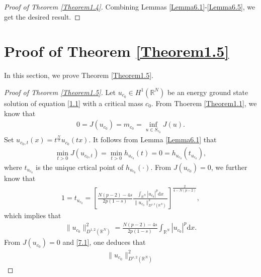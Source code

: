 \documentclass[12pt,a4paper,reqno]{amsart}
\numberwithin{equation}{section}
\begin{document}
\begin{proof}[Proof of Theorem \ref{Theorem1.4}]
Combining Lemmas \ref{Lemma6.1}-\ref{Lemma6.5}, we get the desired result.
\end{proof}



\section{Proof of Theorem \ref{Theorem1.5}}
In this section, we prove Theorem \ref{Theorem1.5}.
\begin{proof}[Proof of Theorem \ref{Theorem1.5}]
Let $u_{c_{0}}\in H^{1}(\mathbb{R}^{N})$ be an energy ground state solution of equation \eqref{1.1} with a critical mass $c_{0}$.
From Thoerem \ref{Theorem1.1}, we know that
\begin{equation*}
\begin{aligned}
0=J(u_{c_{0}})=m_{c_{0}}=\inf_{u\in S_{c_{0}}} J(u).
\end{aligned}
\end{equation*}
Set $u_{c_{0},t}(x)=t^{\frac{N}{2}}u_{c_{0}}(tx)$.
It follows from Lemma \ref{Lemma6.1} that
\begin{equation*}
\begin{aligned}
\min\limits_{t>0}
J(u_{c_{0},t})
=\min\limits_{t>0}
h_{u_{c_{0}}}(t)=0
=h_{u_{c_{0}}}(t_{u_{c_{0}}}),
\end{aligned}
\end{equation*}
where $t_{u_{c_{0}}}$ is the unique crtical point of $h_{u_{c_{0}}}(\cdot)$. From $J(u_{c_{0}})=0$, we further know that
\begin{equation*}
\begin{aligned}
1=t_{u_{c_{0}}}=\left[\frac{N(p-2)-4s}{2p(1-s)}
\frac{\int_{\mathbb{R}^{N}}
|u_{c_{0}}|^{p}
\mathrm{d}x}{\|u_{c_{0}}\|_{D^{1,2}(\mathbb{R}^{N})}^{2}}\right]^{\frac{2}{4-N(p-2)}},
\end{aligned}
\end{equation*}
which implies that
\begin{equation}\label{7.1}
\begin{aligned}
\|u_{c_{0}}\|_{D^{1,2}(\mathbb{R}^{N})}^{2}
=\frac{N(p-2)-4s}{2p(1-s)}
\int_{\mathbb{R}^{N}}
|u_{c_{0}}|^{p}
\mathrm{d}x.
\end{aligned}
\end{equation}
From $J(u_{c_{0}})=0$ and \eqref{7.1},
one deduces that
\begin{equation}\label{7.2}
\begin{aligned}
\|u_{c_{0}}\|_{D^{s,2}(\mathbb{R}^{N})}^{2}

\end{aligned}
\end{equation}
\end{proof}
\end{document}
